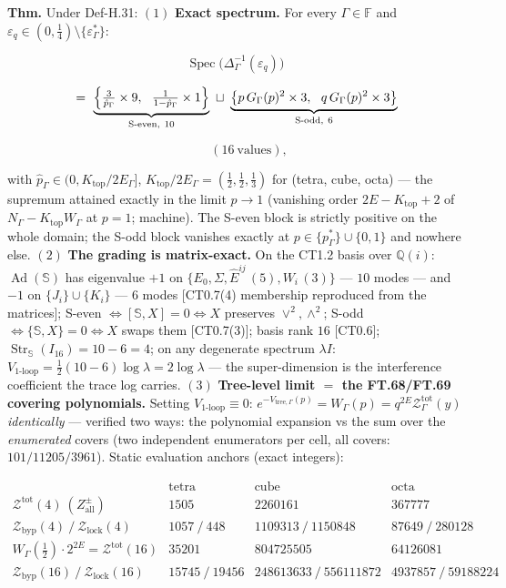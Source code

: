 \begin{theorem}\label{tag:FT-102}
\textbf{Thm.} Under Def-H.31: $(1)$ \textbf{Exact spectrum.} For every $\Gamma\in\mathbb F$ and $\varepsilon_q\in(0,\tfrac14)\setminus\{\varepsilon^*_\Gamma\}$:

\[
\operatorname{Spec}\bigl(\Delta^{-1}_\Gamma(\varepsilon_q)\bigr)\
\]

\[
= \ \underbrace{\Bigl\{\tfrac3{\hat p_\Gamma}\times9,\ \ \tfrac1{1-\hat p_\Gamma}\times1\Bigr\}}_{\text{S-even},\ 10}\ \sqcup\ \underbrace{\bigl\{p\,G_\Gamma(p)^2\times3,\ \ q\,G_\Gamma(p)^2\times3\bigr\}}_{\text{S-odd},\ 6}
\]

\[
\qquad (16\ \text{values}),
\]

with $\hat p_\Gamma\in(0,K_{\mathrm{top}}/2E_\Gamma]$, $K_{\mathrm{top}}/2E_\Gamma=(\tfrac12,\tfrac12,\tfrac13)$ for (tetra, cube, octa) — the supremum attained exactly in the limit $p\to1$ (vanishing order $2E-K_{\mathrm{top}}+2$ of $N_\Gamma-K_{\mathrm{top}}W_\Gamma$ at $p=1$; machine). The S-even block is strictly positive on the whole domain; the S-odd block vanishes exactly at $p\in\{p^*_\Gamma\}\cup\{0,1\}$ and nowhere else. $(2)$ \textbf{The grading is matrix-exact.} On the CT1.2 basis over $\mathbb Q(i)$: $\operatorname{Ad}(\mathbb S)$ has eigenvalue $+1$ on $\{E_0,\Sigma,\hat E^{ij}\,(5),W_i\,(3)\}$ — $10$ modes — and $-1$ on $\{J_i\}\cup\{K_i\}$ — $6$ modes [CT0.7(4) membership reproduced from the matrices]; S-even $\iff[\mathbb S,X]=0\iff X$ preserves $\vee^2,\wedge^2$; S-odd $\iff\{\mathbb S,X\}=0\iff X$ swaps them [CT0.7(3)]; basis rank $16$ [CT0.6]; $\operatorname{Str}_{\mathbb S}(I_{16})=10-6=4$; on any degenerate spectrum $\lambda I$: $V_{\text{1-loop}}=\tfrac12(10-6)\log\lambda=2\log\lambda$ — the super-dimension is the interference coefficient the trace log carries. $(3)$ \textbf{Tree-level limit $=$ the FT.68/FT.69 covering polynomials.} Setting $V_{\text{1-loop}}\equiv0$: $e^{-V_{\text{tree},\Gamma}(p)}=W_\Gamma(p)=q^{2E}\mathcal Z^{\mathrm{tot}}_\Gamma(y)$ \textit{identically} — verified two ways: the polynomial expansion vs the sum over the \textit{enumerated} covers (two independent enumerators per cell, all covers: $101/11205/3961$). Static evaluation anchors (exact integers):

\[
\begin{array}{c|ccc}
&\text{tetra}&\text{cube}&\text{octa}\\ \hline
\mathcal Z^{\mathrm{tot}}(4)\ (Z^\pm_{\mathrm{all}}) & 1505 & 2260161 & 367777\\
\mathcal Z_{\mathrm{byp}}(4)\ /\ \mathcal Z_{\mathrm{lock}}(4) & 1057\ /\ 448 & 1109313\ /\ 1150848 & 87649\ /\ 280128\\
W_\Gamma(\tfrac12)\cdot2^{2E}=\mathcal Z^{\mathrm{tot}}(16) & 35201 & 804725505 & 64126081\\
\mathcal Z_{\mathrm{byp}}(16)\ /\ \mathcal Z_{\mathrm{lock}}(16) & 15745\ /\ 19456 & 248613633\ /\ 556111872 & 4937857\ /\ 59188224
\end{array}
\]


\end{theorem}

